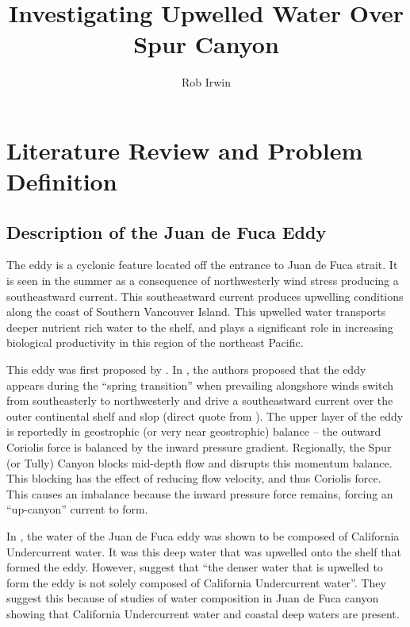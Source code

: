 \documentclass[12pt]{extreport}
\title{Investigating Upwelled Water Over Spur Canyon}
\author{Rob Irwin}
\begin{document}
\maketitle

\tableofcontents
\listoftables
\listoffigures

\chapter{Literature Review and Problem Definition}

\section{Description of the Juan de Fuca Eddy}

The eddy is a cyclonic feature located off the entrance to Juan de Fuca strait. It is seen in the summer as a consequence of northwesterly wind stress producing a southeastward current. This southeastward current produces upwelling conditions along the coast of Southern Vancouver Island. This upwelled water transports deeper nutrient rich water to the shelf, and plays a significant role in increasing biological productivity in this region of the northeast Pacific.

This eddy was first proposed by \cite{tully1941surface}. In 
\cite{freeland1982topographically}
, the authors proposed that the eddy appears during the ``spring transition'' when prevailing alongshore winds switch from southeasterly to northwesterly and drive a southeastward current over the outer continental shelf and slop (direct quote from \cite{foreman2008modeling}). The upper layer of the eddy is reportedly in geostrophic (or very near geostrophic) balance -- the outward Coriolis force is balanced by the inward pressure gradient. Regionally, the Spur (or Tully) Canyon blocks mid-depth flow and disrupts this momentum balance. This blocking has the effect of reducing flow velocity, and thus Coriolis force. This causes an imbalance because the inward pressure force remains, forcing an ``up-canyon'' current to form.

In \cite{freeland1982topographically}, the water of the Juan de Fuca eddy was shown to be composed of California Undercurrent water. It was this deep water that was upwelled onto the shelf that formed the eddy. However, \cite{foreman2008modeling} suggest that ``the denser water that is upwelled to form the eddy is not solely composed of California Undercurrent water''. They suggest this because of studies of water composition in Juan de Fuca canyon showing that California Undercurrent water and coastal deep waters are present.
\end{document}
